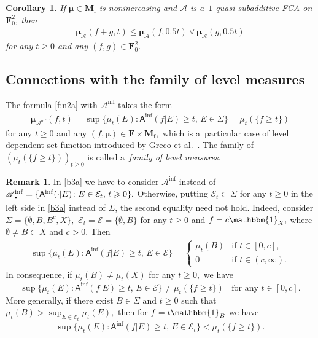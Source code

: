 \documentclass[preprint,11pt]{elsarticle}
\newtheorem{corollary}[tw]{Corollary}
\theoremstyle{definition}
\newtheorem{remark}[tw]{Remark}
\newcommand\bF{\mathbf{F}} %
\newcommand\bMf{\mathbf{M}_{\mathrm{f}}}%
\newcommand\cE{{\mathcal E}}
\newcommand\sA{\mathsf{A}}
\newcommand\sbullet[1][.5]{\mathbin{\vcenter{\hbox{\scalebox{#1}{$\bullet$}}}}}
\newcommand\bA{\mathscr{A}}%
\newcommand\beA{\mathscr {A}_{|\sbullet}}%
\newcommand\bpeA{\mathscr {A}_{\sbullet|\sbullet}}%
\newcommand{\bmu}{\boldsymbol{\mu}}
\newcommand\bmub[1][\bpeA]{\bmu_{#1}}
\renewcommand\ge{\geqslant}
\renewcommand\le{\leqslant}
\newcommand{\mI}[1]{\mathbbm{1}_{#1}}%
\newcommand{\tx}{\textstyle{}}
\begin{document}
\begin{corollary}\label{cor:3.19}
If $\bmu\in\bMf$ is nonincreasing and $\bA$ is a~$1$-quasi-subadditive FCA on $\bF_0^2$, then
\begin{align*}
\bmub[\bA](f+g,t)\le \bmub[\bA](f,0.5 t)\vee \bmub[\bA](g,0.5 t)
\end{align*}
for any $t\ge 0$ and any $(f,g)\in\bF_0^2.$
\end{corollary}


\subsection{\textbf{Connections with the family of level measures}}\label{sec:3.2}

The formula \eqref{f:n2a} with $\bA^{\inf}$ takes the form
\begin{align}\label{b3a}
    \bmu_{\bA^{\inf}}(f,t)=\sup\big\{\mu_t(E)\colon \sA^{\inf}(f|E) \ge t,\, E\in \Sigma\big\}=\mu_t(\{f\ge t\})
\end{align}
for any $t\ge 0$ and any $(f, \bmu)\in\bF\times\bMf,$ which is a~particular case of level dependent set function introduced by Greco et al.~\cite{Greco2011}.
The family of $(\mu_t(\{f\ge t\}))_{t\ge 0}$ is called a~\textit{family of level measures}.



\begin{remark}\label{rem:collection}
In \eqref{b3a} we have to consider $\bA^{\inf}$ instead of $\beA^{\inf} = \{\sA^{\inf}(\cdot|E)\colon E\in \cE_t,\,t\ge 0\}.$
Otherwise, putting $\cE_t\subset \Sigma$ for any $t\ge 0$ in the left side in \eqref{b3a} instead of  $\Sigma$, the second equality need not hold.
Indeed, consider $\Sigma=\{\emptyset,B,B^c,X\},$ $\cE_t=\cE=\{\emptyset,B\}$ for any $t\ge 0$   and $f=c\mI{X},$ where $\emptyset \neq B\subset X$ and $c>0.$ Then
\begin{align*}
    \sup\big\{\mu_t(E)\colon \sA^{\inf}(f|E) \ge t,\, E\in \cE\big\}=\begin{cases}
   \mu_t(B) & \text{if } t\in [0,c],\\
  0 & \text{if } t\in (c,\infty).
\end{cases}
\end{align*}
In consequence, if $\mu_t(B)\neq \mu_t(X)$ for any $t\ge 0,$ we have
$$
\sup\{\mu_t(E)\colon \sA^{\inf}(f|E) \ge t,\, E\in \cE\}\neq \mu_t(\{f\ge t\})\; \;\textrm{ for any } t\in [0,c].
$$
More generally, if there exist  $B\in \Sigma$ and $t\ge 0$ such that $\mu_t(B)>{\tx \sup_{E\in \cE_t}\mu_t(E)},$ then for $f=t\mI{B}$ we have
$$\tx{\sup\{\mu_t(E)\colon \sA^{\inf}(f|E) \ge t,\, E\in \cE_t\}<\mu_t(\{f\ge t\})}.$$
\end{remark}
\end{document}
